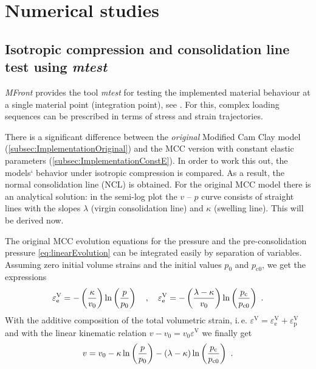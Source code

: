 \documentclass[paper=a4, twoside, pagesize]{scrartcl}
\begin{document}
\section{Numerical studies}

\subsection{Isotropic compression and consolidation line test using \textsl{mtest}}\label{subsec:consolidationLine}

\textsl{MFront} provides the tool \textsl{mtest} for testing the implemented material behaviour at a single material point (integration point), see \cite{Helfer2015}. For this, complex loading sequences can be prescribed in terms of stress and strain trajectories.
\par
There is a significant difference between the \emph{original} Modified Cam Clay model (\autoref{subsec:ImplementationOriginal}) and the MCC version with constant elastic parameters (\autoref{subsec:ImplementationConstE}). In order to work this out,
the models` behavior under isotropic compression is compared. As a result, the normal consolidation line (NCL) is obtained. For the original MCC model there is an analytical solution:
in the semi-log plot the $v$ -- $p$ curve consists of straight lines with the slopes $\lambda$ (virgin consolidation line) and $\kappa$ (swelling line). This will be derived now.
\par
The original MCC evolution equations for the pressure and the pre-consolidation pressure \eqref{eq:linearEvolution} can be integrated easily by separation of variables. Assuming zero initial volume strains and the initial values $p_0$ and $p_\text{c0}$, we get the expressions
\begin{equation}
  {\varepsilon}_\text{e}^\text{V} = -\left(\frac{\kappa}{v_0}\right)\ln\left(\frac{p}{p_0}\right)
  \quad,\quad 
  {\varepsilon}_\text{e}^\text{V} = -\left(\frac{\lambda-\kappa}{v_0}\right) \ln\left(\frac{p_\text{c}}{p_\text{c0}}\right)
  \ . \\
\end{equation}
With the additive composition of the total volumetric strain, i.\,e. ${\varepsilon}^\text{V} = {\varepsilon}_\text{e}^\text{V} + {\varepsilon}_\text{p}^\text{V}$ and with the linear kinematic relation $v - v_0 = v_0 \varepsilon^\text{V}$ we finally get
\begin{equation}
  v = v_0 - \kappa\ln\left(\frac{p}{p_0}\right) - (\lambda-\kappa) \ln\left(\frac{p_\text{c}}{p_\text{c0}}\right)
  \ . \\
\end{equation}
\end{document}
